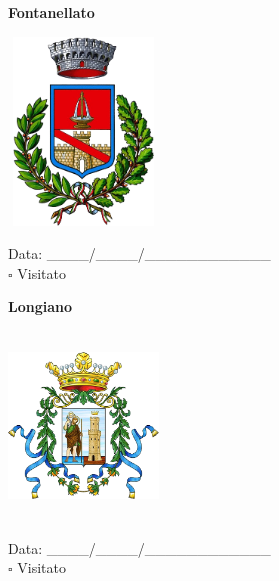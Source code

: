 \documentclass[a5paper,12pt]{article}
\begin{document}
\vspace{0.7cm}

\noindent
\begin{minipage}[t]{0.45\textwidth}
    \begin{center}
        \textbf{Fontanellato}
    \end{center}
    \vspace{-0.5cm} %
    \begin{center}
        \includegraphics[height= 5cm, width=4cm]{Emilia Romagna/Stemma Fontanellato.png}
    \end{center}
    \vspace{-0.4cm} %
    \begin{flushleft}
        Data: \_\_\_\_/\_\_\_\_/\_\_\_\_\_\_\_\_\_\_\_\_ \\
        $\square$ Visitato
    \end{flushleft}
\end{minipage}
\hfill
\noindent
\begin{minipage}[t]{0.45\textwidth}
    \begin{center}
        \textbf{Longiano}
    \end{center}
    \vspace{-0.5cm} %
    \begin{center}
        \includegraphics[height= 5cm, width=4cm]{Emilia Romagna/Stemma Longiano.png}
    \end{center}
    \vspace{-0.4cm} %
    \begin{flushleft}
        Data: \_\_\_\_/\_\_\_\_/\_\_\_\_\_\_\_\_\_\_\_\_ \\
        $\square$ Visitato
    \end{flushleft}
\end{minipage}
\end{document}
